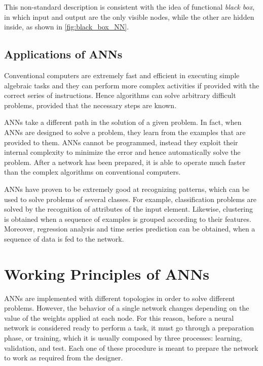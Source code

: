 This non-standard description is consistent with the idea of functional \textit{black box}, in which input and output are the only visible nodes, while the other are hidden inside, as shown in \autoref{fig:black_box_NN}.

\subsection{Applications of ANNs}
\label{ssec:Applications_of_ANNs}
Conventional computers are extremely fast and efficient in executing simple algebraic tasks and they can perform more complex activities if provided with the correct series of instructions.
Hence algorithms can solve arbitrary difficult problems, provided that the necessary steps are known.

\aclp{ANN} take a different path in the solution of a given problem.
In fact, when \acsp{ANN} are designed to solve a problem, they learn from the examples that are provided to them.
\acsp{ANN} cannot be programmed, instead they exploit their internal complexity to minimize the error and hence automatically solve the problem.
After a network has been prepared, it is able to operate much faster than the complex algorithms on conventional computers.

\acsp{ANN} have proven to be extremely good at recognizing patterns, which can be used to solve problems of several classes.
For example, classification problems are solved by the recognition of attributes of the input element.
Likewise, clustering is obtained when a sequence of examples is grouped according to their features.
Moreover, regression analysis and time series prediction can be obtained, when a sequence of data is fed to the network.

\newpage
\section{Working Principles of ANNs}
\label{sec:Working_Principles_of_ANNs}
\acsp{ANN} are implemented with different topologies in order to solve different problems.
However, the behavior of a single network changes depending on the value of the weights applied at each node.
For this reason, before a neural network is considered ready to perform a task, it must go through a preparation phase, or training, which it is usually composed by three processes: learning, validation, and test.
Each one of these procedure is meant to prepare the network to work as required from the designer.

